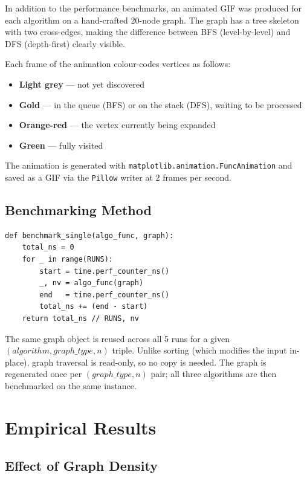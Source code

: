In addition to the performance benchmarks, an animated GIF was produced for each algorithm on a hand-crafted 20-node graph. The graph has a tree skeleton with two cross-edges, making the difference between BFS (level-by-level) and DFS (depth-first) clearly visible.

Each frame of the animation colour-codes vertices as follows:
\begin{itemize}
    \item \textbf{Light grey} — not yet discovered
    \item \textbf{Gold} — in the queue (BFS) or on the stack (DFS), waiting to be processed
    \item \textbf{Orange-red} — the vertex currently being expanded
    \item \textbf{Green} — fully visited
\end{itemize}

The animation is generated with \texttt{matplotlib.animation.FuncAnimation} and saved as a GIF via the \texttt{Pillow} writer at 2 frames per second.

\subsection{Benchmarking Method}

\begin{verbatim}
def benchmark_single(algo_func, graph):
    total_ns = 0
    for _ in range(RUNS):
        start = time.perf_counter_ns()
        _, nv = algo_func(graph)
        end   = time.perf_counter_ns()
        total_ns += (end - start)
    return total_ns // RUNS, nv
\end{verbatim}

The same graph object is reused across all 5 runs for a given $(algorithm, graph\_type, n)$ triple. Unlike sorting (which modifies the input in-place), graph traversal is read-only, so no copy is needed. The graph is regenerated once per $(graph\_type, n)$ pair; all three algorithms are then benchmarked on the same instance.



\section{Empirical Results}

\subsection{Effect of Graph Density}


